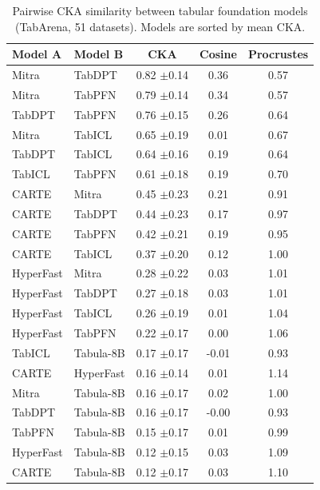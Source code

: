 \begin{table}[t]
\centering
\caption{Pairwise CKA similarity between tabular foundation models (TabArena, 51 datasets). Models are sorted by mean CKA.}
\label{tab:cka_pairwise}
\small
\begin{tabular}{llccc}
\toprule
Model A & Model B & CKA & Cosine & Procrustes \\
\midrule
Mitra & TabDPT & 0.82 \tiny{$\pm$0.14} & 0.36 & 0.57 \\
Mitra & TabPFN & 0.79 \tiny{$\pm$0.14} & 0.34 & 0.57 \\
TabDPT & TabPFN & 0.76 \tiny{$\pm$0.15} & 0.26 & 0.64 \\
Mitra & TabICL & 0.65 \tiny{$\pm$0.19} & 0.01 & 0.67 \\
TabDPT & TabICL & 0.64 \tiny{$\pm$0.16} & 0.19 & 0.64 \\
TabICL & TabPFN & 0.61 \tiny{$\pm$0.18} & 0.19 & 0.70 \\
CARTE & Mitra & 0.45 \tiny{$\pm$0.23} & 0.21 & 0.91 \\
CARTE & TabDPT & 0.44 \tiny{$\pm$0.23} & 0.17 & 0.97 \\
CARTE & TabPFN & 0.42 \tiny{$\pm$0.21} & 0.19 & 0.95 \\
CARTE & TabICL & 0.37 \tiny{$\pm$0.20} & 0.12 & 1.00 \\
HyperFast & Mitra & 0.28 \tiny{$\pm$0.22} & 0.03 & 1.01 \\
HyperFast & TabDPT & 0.27 \tiny{$\pm$0.18} & 0.03 & 1.01 \\
HyperFast & TabICL & 0.26 \tiny{$\pm$0.19} & 0.01 & 1.04 \\
HyperFast & TabPFN & 0.22 \tiny{$\pm$0.17} & 0.00 & 1.06 \\
TabICL & Tabula-8B & 0.17 \tiny{$\pm$0.17} & -0.01 & 0.93 \\
CARTE & HyperFast & 0.16 \tiny{$\pm$0.14} & 0.01 & 1.14 \\
Mitra & Tabula-8B & 0.16 \tiny{$\pm$0.17} & 0.02 & 1.00 \\
TabDPT & Tabula-8B & 0.16 \tiny{$\pm$0.17} & -0.00 & 0.93 \\
TabPFN & Tabula-8B & 0.15 \tiny{$\pm$0.17} & 0.01 & 0.99 \\
HyperFast & Tabula-8B & 0.12 \tiny{$\pm$0.15} & 0.03 & 1.09 \\
CARTE & Tabula-8B & 0.12 \tiny{$\pm$0.17} & 0.03 & 1.10 \\
\bottomrule
\end{tabular}
\end{table}